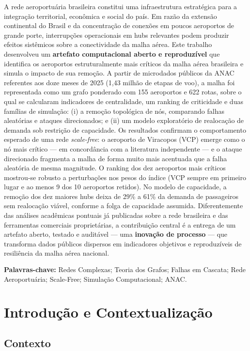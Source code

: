 \documentclass[12pt,a4paper]{article}
\begin{document}
A rede aeroportuária brasileira constitui uma infraestrutura estratégica para a integração
territorial, econômica e social do país. Em razão da extensão continental do Brasil e da
concentração de conexões em poucos aeroportos de grande porte, interrupções operacionais em
hubs relevantes podem produzir efeitos sistêmicos sobre a conectividade da malha aérea. Este
trabalho desenvolveu um \textbf{artefato computacional aberto e reproduzível} que identifica os
aeroportos estruturalmente mais críticos da malha aérea brasileira e simula o impacto de sua
remoção. A partir de microdados públicos da ANAC referentes aos doze meses de 2025
(1{,}43 milhão de etapas de voo), a malha foi representada como um grafo ponderado com
155 aeroportos e 622 rotas, sobre o qual se calcularam indicadores de centralidade, um ranking
de criticidade e duas famílias de simulação: (i) a remoção topológica de nós, comparando falhas
aleatórias e ataques direcionados; e (ii) um modelo exploratório de realocação de demanda sob
restrição de capacidade. Os resultados confirmam o comportamento esperado de uma rede
\textit{scale-free}: o aeroporto de Viracopos (VCP) emerge como o nó mais crítico --- em
concordância com a literatura independente --- e o ataque direcionado fragmenta a malha de forma
muito mais acentuada que a falha aleatória de mesma magnitude. O ranking dos dez aeroportos mais
críticos mostrou-se robusto a perturbações nos pesos do índice (VCP sempre em primeiro lugar e ao
menos 9 dos 10 aeroportos retidos). No modelo
de capacidade, a remoção dos dez maiores hubs deixa de 29\% a 61\% da demanda de passageiros sem
realocação viável, conforme a folga de capacidade assumida. Diferentemente das análises
acadêmicas pontuais já publicadas sobre a rede brasileira e das ferramentas comerciais
proprietárias, a contribuição central é a entrega de um artefato aberto, testado e auditável ---
uma \textbf{inovação de processo} --- que transforma dados públicos dispersos em indicadores
objetivos e reproduzíveis de resiliência da malha aérea nacional.

\medskip
\noindent\textbf{Palavras-chave:} Redes Complexas; Teoria dos Grafos; Falhas em Cascata;
Rede Aeroportuária; Scale-Free; Simulação Computacional; ANAC.

\section{Introdução e Contextualização}

\subsection{Contexto}
\end{document}
